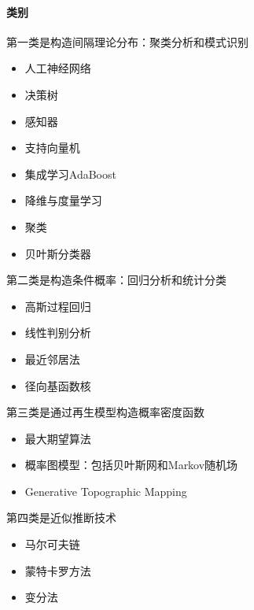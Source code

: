 \documentclass[letterpaper,11pt,english]{sphinxmanual}
\begin{document}
\paragraph{类别}
\label{\detokenize{chapter_AI_dive/ML:id7}}
第一类是构造间隔理论分布：聚类分析和模式识别
\begin{itemize}
\item {} 
人工神经网络

\item {} 
决策树

\item {} 
感知器

\item {} 
支持向量机

\item {} 
集成学习AdaBoost

\item {} 
降维与度量学习

\item {} 
聚类

\item {} 
贝叶斯分类器

\end{itemize}

第二类是构造条件概率：回归分析和统计分类
\begin{itemize}
\item {} 
高斯过程回归

\item {} 
线性判别分析

\item {} 
最近邻居法

\item {} 
径向基函数核

\end{itemize}

第三类是通过再生模型构造概率密度函数
\begin{itemize}
\item {} 
最大期望算法

\item {} 
概率图模型：包括贝叶斯网和Markov随机场

\item {} 
Generative Topographic Mapping

\end{itemize}

第四类是近似推断技术
\begin{itemize}
\item {} 
马尔可夫链

\item {} 
蒙特卡罗方法

\item {} 
变分法

\end{itemize}
\end{document}
